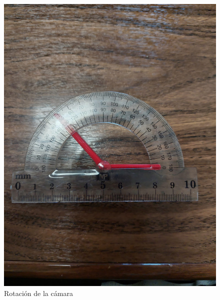 \begin{figure}[ht!]
	\centering
	\begin{minipage}{0.35\linewidth}
		\centering
		\includegraphics[width=\linewidth]{figs/cap6/rotation.jpeg}
		\caption*{\centering Rotación de la cámara} 
	\end{minipage}
	\hspace{2 cm}
	\begin{minipage}{0.35\linewidth}
		\centering

\end{minipage}
\end{figure}
